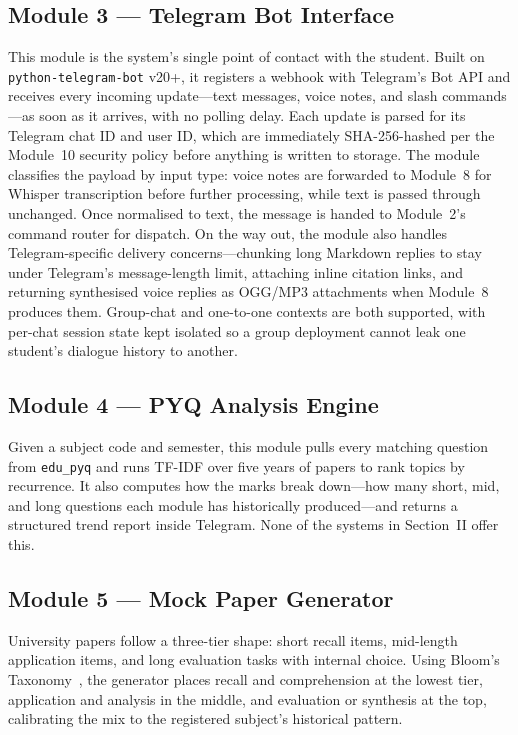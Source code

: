 \documentclass[conference]{IEEEtran}
\begin{document}
\subsection{Module 3 --- Telegram Bot Interface}
This module is the system's single point of contact with the student.
Built on \texttt{python-telegram-bot} v20+, it registers a webhook with
Telegram's Bot API and receives every incoming update---text messages,
voice notes, and slash commands---as soon as it arrives, with no
polling delay. Each update is parsed for its Telegram chat ID and user
ID, which are immediately SHA-256-hashed per the Module~10 security
policy before anything is written to storage. The module classifies
the payload by input type: voice notes are forwarded to Module~8 for
Whisper transcription before further processing, while text is passed
through unchanged. Once normalised to text, the message is handed to
Module~2's command router for dispatch. On the way out, the module also
handles Telegram-specific delivery concerns---chunking long Markdown
replies to stay under Telegram's message-length limit, attaching
inline citation links, and returning synthesised voice replies as
OGG/MP3 attachments when Module~8 produces them. Group-chat and
one-to-one contexts are both supported, with per-chat session state
kept isolated so a group deployment cannot leak one student's dialogue
history to another.
\subsection{Module 4 --- PYQ Analysis Engine}
Given a subject code and semester, this module pulls every matching
question from \texttt{edu\_pyq} and runs TF-IDF over five years of
papers to rank topics by recurrence. It also computes how the marks
break down---how many short, mid, and long questions each module has
historically produced---and returns a structured trend report inside
Telegram. None of the systems in Section~II offer this.
\subsection{Module 5 --- Mock Paper Generator}
University papers follow a three-tier shape: short recall items,
mid-length application items, and long evaluation tasks with internal
choice. Using Bloom's Taxonomy~\cite{bloom1984}, the generator places
recall and comprehension at the lowest tier, application and analysis
in the middle, and evaluation or synthesis at the top, calibrating the
mix to the registered subject's historical pattern.
\end{document}
